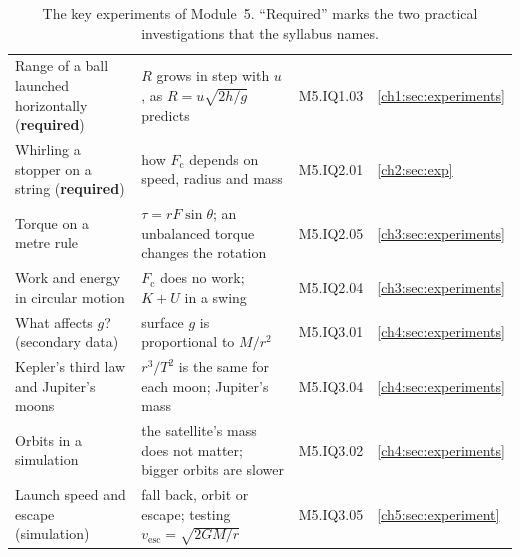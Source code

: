\begin{table}
  \caption{The key experiments of Module~5. ``Required'' marks the two practical
    investigations that the syllabus names.}\label{ov:tab:experiments}
  \centering
  \small
  \begin{tabular}{@{}L{48mm}L{54mm}L{17mm}L{17mm}@{}}
    \toprule
     &  &  & \\
    \midrule
    Range of a ball launched horizontally (\textbf{required})
      & $R$ grows in step with $u$, as $R = u\sqrt{2h/g}$ predicts & M5.IQ1.03 & \cref{ch1:sec:experiments}\\
    Whirling a stopper on a string (\textbf{required})
      & how $F_\mathrm{c}$ depends on speed, radius and mass & M5.IQ2.01 & \cref{ch2:sec:exp}\\
    Torque on a metre rule
      & $\tau = rF\sin\theta$; an unbalanced torque changes the rotation & M5.IQ2.05 & \cref{ch3:sec:experiments}\\
    Work and energy in circular motion
      & $F_\mathrm{c}$ does no work; $K + U$ in a swing & M5.IQ2.04 & \cref{ch3:sec:experiments}\\
    What affects $g$? (secondary data)
      & surface $g$ is proportional to $M/r^2$ & M5.IQ3.01 & \cref{ch4:sec:experiments}\\
    Kepler's third law and Jupiter's moons
      & $r^3/T^2$ is the same for each moon; Jupiter's mass & M5.IQ3.04 & \cref{ch4:sec:experiments}\\
    Orbits in a simulation
      & the satellite's mass does not matter; bigger orbits are slower & M5.IQ3.02 & \cref{ch4:sec:experiments}\\
    Launch speed and escape (simulation)
      & fall back, orbit or escape; testing $v_\mathrm{esc} = \sqrt{2GM/r}$ & M5.IQ3.05 & \cref{ch5:sec:experiment}\\
    \bottomrule
  \end{tabular}
\end{table}
